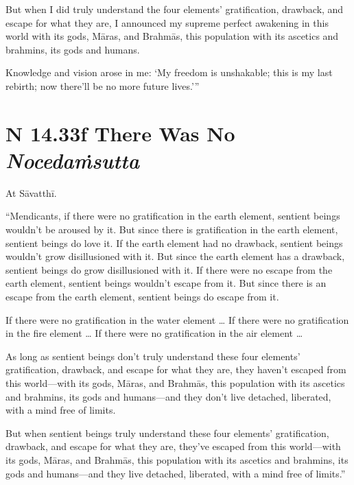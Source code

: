\documentclass[12pt,openany]{book}%
\newcommand*{\suttatitleacronym}[1]{\smaller[2]{#1}\vspace*{.3em}}
\newcommand*{\suttatitletranslation}[1]{\linebreak{#1}}
\newcommand*{\suttatitleroot}[1]{\linebreak\smaller[2]\itshape{#1}}
\newcommand*{\tocacronym}[1]{\hspace*{-3.3em}{#1}\quad}
\newcommand*{\toctranslation}[1]{#1}
\newcommand*{\tocroot}[1]{(\textit{#1})}
\begin{document}
But when I did truly understand the four elements’ gratification, drawback, and escape for what they are, I announced my supreme perfect awakening in this world with its gods, \textsanskrit{Māras}, and \textsanskrit{Brahmās}, this population with its ascetics and brahmins, its gods and humans. 

Knowledge and vision arose in me: ‘My freedom is unshakable; this is my last rebirth; now there’ll be no more future lives.’” 

%
\section*{{\suttatitleacronym SN 14.33}{\suttatitletranslation If There Was No }{\suttatitleroot Nocedaṁsutta}}
\addcontentsline{toc}{section}{\tocacronym{SN 14.33} \toctranslation{If There Was No } \tocroot{Nocedaṁsutta}}

At \textsanskrit{Sāvatthī}. 

“Mendicants, if there were no gratification in the earth element, sentient beings wouldn’t be aroused by it. But since there is gratification in the earth element, sentient beings do love it. If the earth element had no drawback, sentient beings wouldn’t grow disillusioned with it. But since the earth element has a drawback, sentient beings do grow disillusioned with it. If there were no escape from the earth element, sentient beings wouldn’t escape from it. But since there is an escape from the earth element, sentient beings do escape from it. 

If there were no gratification in the water element … If there were no gratification in the fire element … If there were no gratification in the air element … 

As long as sentient beings don’t truly understand these four elements’ gratification, drawback, and escape for what they are, they haven’t escaped from this world—with its gods, \textsanskrit{Māras}, and \textsanskrit{Brahmās}, this population with its ascetics and brahmins, its gods and humans—and they don’t live detached, liberated, with a mind free of limits. 

But when sentient beings truly understand these four elements’ gratification, drawback, and escape for what they are, they’ve escaped from this world—with its gods, \textsanskrit{Māras}, and \textsanskrit{Brahmās}, this population with its ascetics and brahmins, its gods and humans—and they live detached, liberated, with a mind free of limits.” 
\end{document}
